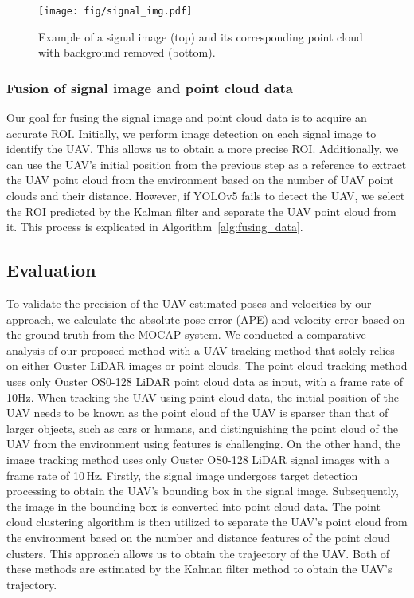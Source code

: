 \begin{figure}[b] 
    \centering   
    \texttt{[image: fig/signal\_img.pdf]}  
    \caption{Example of a signal image (top) and its corresponding point cloud with background removed (bottom).}
    \label{fig:signal_image} 
\end{figure}


\subsubsection{Fusion of signal image and point cloud data}

Our goal for fusing the signal image and point cloud data is to acquire an accurate ROI. Initially, we perform image detection on each signal image to identify the UAV. This allows us to obtain a more precise ROI. Additionally, we can use the UAV's initial position from the previous step as a reference to extract the UAV point cloud from the environment based on the number of UAV point clouds and their distance. However, if YOLOv5 fails to detect the UAV, we select the ROI predicted by the Kalman filter and separate the UAV point cloud from it. This process is explicated in Algorithm~\ref{alg:fusing_data}.




\subsection{Evaluation}
To validate the precision of the UAV estimated poses and velocities by our approach, we calculate the absolute pose error (APE) and velocity error based on the ground truth from the MOCAP system. We conducted a comparative analysis of our proposed method with a UAV tracking method that solely relies on either Ouster LiDAR images or point clouds.
The point cloud tracking method uses only Ouster OS0-128 LiDAR point cloud data as input, with a frame rate of\,10Hz. When tracking the UAV using point cloud data, the initial position of the UAV needs to be known as the point cloud of the UAV is sparser than that of larger objects, such as cars or humans, and distinguishing the point cloud of the UAV from the environment using features is challenging. On the other hand, the image tracking method uses only Ouster OS0-128 LiDAR signal images with a frame rate of 10\,Hz. Firstly, the signal image undergoes target detection processing to obtain the UAV's bounding box in the signal image. Subsequently, the image in the bounding box is converted into point cloud data. The point cloud clustering algorithm is then utilized to separate the UAV's point cloud from the environment based on the number and distance features of the point cloud clusters. This approach allows us to obtain the trajectory of the UAV. Both of these methods are estimated by the Kalman filter method to obtain the UAV's trajectory.

